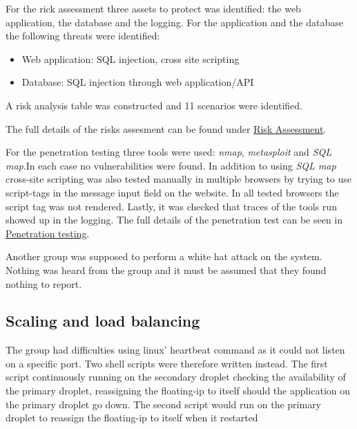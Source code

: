 For the rick assessment three assets to protect was identified: the web application, the database and the logging. For the application and the database the following threats were identified:

\begin{itemize}
    \item Web application: SQL injection, cross site scripting
    \item Database: SQL injection through web application/API
\end{itemize}

A risk analysis table was constructed and 11 scenarios were identified. 

The full details of the risks assesment can be found under \underline{\href{https://github.com/DevOps2021-gb/devops2021/wiki/Risk-assesment}{Risk Assessment}}.

For the penetration testing three tools were used: \textit{nmap}, \textit{metasploit} and \textit{SQL map}.In each case no vulnerabilities were found. In addition to using \textit{SQL map} cross-site scripting was also tested manually in multiple browsers by trying to use script-tags in the message input field on the website. In all tested browsers the script tag was not rendered. Lastly, it was checked that traces of the tools run showed up in the logging. The full details of the penetration test can be seen in \underline{\href{https://github.com/DevOps2021-gb/devops2021/wiki/Penetration-testing}{Penetration testing}}. 

Another group was supposed to perform a white hat attack on the system. Nothing was heard from the group and it must be assumed that they found nothing to report.

\subsection{Scaling and load balancing}\label{subsection:scaling} %
The group had difficulties using linux' heartbeat command as it could not listen on a specific port. Two shell scripts were therefore written instead. The first script continuously running on the secondary droplet checking the availability of the primary droplet, reassigning the floating-ip to itself should the application on the primary droplet go down. The second script would run on the primary droplet to reassign the floating-ip to itself when it restarted 